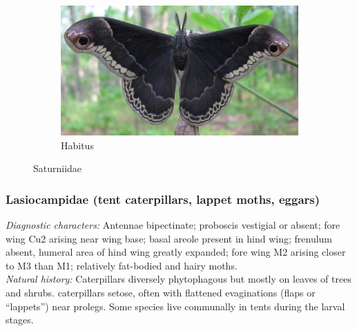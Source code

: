 \documentclass[letterpaper, 11pt]{article}
\begin{document}
\begin{figure}[ht!]
\begin{subfigure}[ht!]{0.31\textwidth}
    \end{subfigure}
    ~ %
    \begin{subfigure}[ht!]{0.48\textwidth}
        \includegraphics[width=\textwidth]{image00}
        \caption{Habitus}
        \label{fig:saturniid2}
    \end{subfigure}
    \caption{Saturniidae}\label{fig:saturniids}
\end{figure}

\subsubsection{Lasiocampidae (tent caterpillars, lappet moths, eggars)}
\noindent{}\textit{Diagnostic characters:} Antennae bipectinate; proboscis vestigial or absent; fore wing Cu2 arising near wing base; basal areole present in hind wing; frenulum absent, humeral area of hind wing greatly expanded; fore wing M2 arising closer to M3 than M1; relatively fat-bodied and hairy moths.\\

\noindent{}\textit{Natural history:} Caterpillars diversely phytophagous but mostly on leaves of trees and shrubs. caterpillars setose, often with flattened evaginations (flaps or ``lappets'') near prolegs. Some species live communally in tents during the larval stages.
\end{document}

